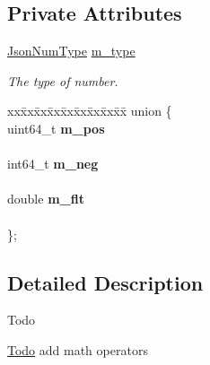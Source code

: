 \subsection*{Private Attributes}
\begin{DoxyCompactItemize}
\item 
\mbox{\label{classnta_1_1utils_1_1JsonNum_abd54e505bcd33dc45877c4b4bb92fa4e}} 
\hyperlink{namespacenta_1_1utils_a83ee7c4cfccd9fa43564f5fe1c0c77d3}{Json\+Num\+Type} \hyperlink{classnta_1_1utils_1_1JsonNum_abd54e505bcd33dc45877c4b4bb92fa4e}{m\+\_\+type}
\begin{DoxyCompactList}\small\item\em The type of number. \end{DoxyCompactList}\item 
\mbox{\label{classnta_1_1utils_1_1JsonNum_a8f60aff135bd41d1680ecdaa738a4a02}} 
\begin{tabbing}
xx\=xx\=xx\=xx\=xx\=xx\=xx\=xx\=xx\=\kill
union \{\\
\mbox{\label{classnta_1_1utils_1_1JsonNum_a266052a158fca895978bb7d9ec43f6ff}} 
uint64\_t {\bfseries m\_pos}\\
\>\\
\mbox{\label{classnta_1_1utils_1_1JsonNum_af488d5d931bc8979df8671070365ac2b}} 
int64\_t {\bfseries m\_neg}\\
\>\\
\mbox{\label{classnta_1_1utils_1_1JsonNum_a01cf51bb14293115a5b3f140ade23d4d}} 
double {\bfseries m\_flt}\\
\>\\
\}; \\

\end{tabbing}\end{DoxyCompactItemize}


\subsection{Detailed Description}
\begin{DoxyRefDesc}{Todo}
\item[\hyperlink{todo__todo000006}{Todo}]add math operators\end{DoxyRefDesc}


